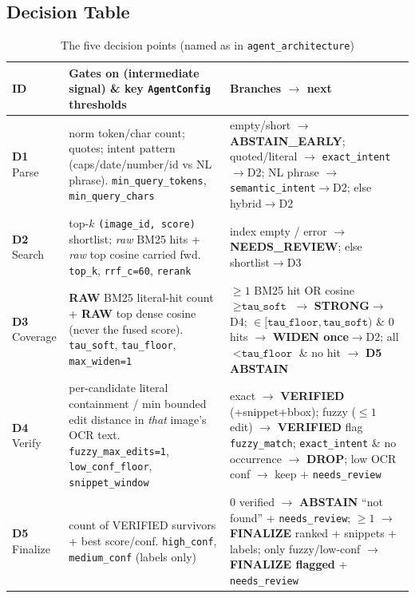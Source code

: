 \documentclass[12pt,a4paper]{article}
\begin{document}
\subsection{Decision Table}

\begin{table}[H]
\centering
\caption{The five decision points (named as in \texttt{agent\_architecture})}
\scriptsize
\setlength{\tabcolsep}{4pt}
\begin{tabularx}{\linewidth}{@{} l L L @{}}
\toprule
\textbf{ID} & \textbf{Gates on (intermediate signal) \& key \texttt{AgentConfig} thresholds} & \textbf{Branches $\rightarrow$ next} \\
\midrule
\textbf{D1} Parse & norm token/char count; quotes; intent pattern (caps/date/number/id vs NL phrase). \texttt{min\_query\_tokens}, \texttt{min\_query\_chars} & empty/short $\rightarrow$ \textbf{ABSTAIN\_EARLY}; quoted/literal $\rightarrow$ \texttt{exact\_intent}$\rightarrow$D2; NL phrase $\rightarrow$ \texttt{semantic\_intent}$\rightarrow$D2; else hybrid$\rightarrow$D2 \\
\textbf{D2} Search & top-$k$ \texttt{(image\_id, score)} shortlist; \emph{raw} BM25 hits + \emph{raw} top cosine carried fwd. \texttt{top\_k}, \texttt{rrf\_c=60}, \texttt{rerank} & index empty / error $\rightarrow$ \textbf{NEEDS\_REVIEW}; else shortlist$\rightarrow$D3 \\
\textbf{D3} Coverage & \textbf{RAW} BM25 literal-hit count + \textbf{RAW} top dense cosine (never the fused score). \texttt{tau\_soft}, \texttt{tau\_floor}, \texttt{max\_widen=1} & $\ge 1$ BM25 hit OR cosine $\ge\texttt{tau\_soft}$ $\rightarrow$ \textbf{STRONG}$\rightarrow$D4; $\in[\texttt{tau\_floor},\texttt{tau\_soft})$ \& 0 hits $\rightarrow$ \textbf{WIDEN once}$\rightarrow$D2; all $<\texttt{tau\_floor}$ \& no hit $\rightarrow$ \textbf{D5 ABSTAIN} \\
\textbf{D4} Verify & per-candidate literal containment / min bounded edit distance in \emph{that} image's OCR text. \texttt{fuzzy\_max\_edits=1}, \texttt{low\_conf\_floor}, \texttt{snippet\_window} & exact $\rightarrow$ \textbf{VERIFIED} (+snippet+bbox); fuzzy ($\le1$ edit) $\rightarrow$ \textbf{VERIFIED} flag \texttt{fuzzy\_match}; \texttt{exact\_intent} \& no occurrence $\rightarrow$ \textbf{DROP}; low OCR conf $\rightarrow$ keep + \texttt{needs\_review} \\
\textbf{D5} Finalize & count of VERIFIED survivors + best score/conf. \texttt{high\_conf}, \texttt{medium\_conf} (labels only) & 0 verified $\rightarrow$ \textbf{ABSTAIN} ``not found'' + \texttt{needs\_review}; $\ge1$ $\rightarrow$ \textbf{FINALIZE} ranked + snippets + labels; only fuzzy/low-conf $\rightarrow$ \textbf{FINALIZE flagged} + \texttt{needs\_review} \\
\bottomrule
\end{tabularx}
\end{table}
\end{document}
